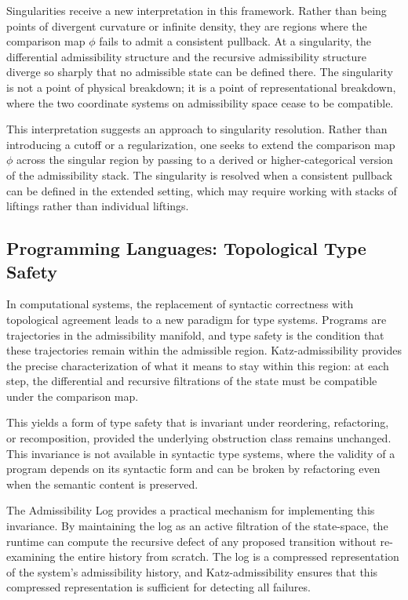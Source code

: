 \documentclass[12pt]{article}
\begin{document}
Singularities receive a new interpretation in this framework. Rather than being points
of divergent curvature or infinite density, they are regions where the comparison map
$\phi$ fails to admit a consistent pullback. At a singularity, the differential
admissibility structure and the recursive admissibility structure diverge so sharply
that no admissible state can be defined there. The singularity is not a point of
physical breakdown; it is a point of representational breakdown, where the two
coordinate systems on admissibility space cease to be compatible.

This interpretation suggests an approach to singularity resolution. Rather than
introducing a cutoff or a regularization, one seeks to extend the comparison map $\phi$
across the singular region by passing to a derived or higher-categorical version of the
admissibility stack. The singularity is resolved when a consistent pullback can be
defined in the extended setting, which may require working with stacks of liftings
rather than individual liftings.

\subsection{Programming Languages: Topological Type Safety}

In computational systems, the replacement of syntactic correctness with topological
agreement leads to a new paradigm for type systems. Programs are trajectories in the
admissibility manifold, and type safety is the condition that these trajectories remain
within the admissible region. Katz-admissibility provides the precise characterization
of what it means to stay within this region: at each step, the differential and
recursive filtrations of the state must be compatible under the comparison map.

This yields a form of type safety that is invariant under reordering, refactoring, or
recomposition, provided the underlying obstruction class remains unchanged. This
invariance is not available in syntactic type systems, where the validity of a program
depends on its syntactic form and can be broken by refactoring even when the semantic
content is preserved.

The Admissibility Log provides a practical mechanism for implementing this invariance.
By maintaining the log as an active filtration of the state-space, the runtime can
compute the recursive defect of any proposed transition without re-examining the entire
history from scratch. The log is a compressed representation of the system's
admissibility history, and Katz-admissibility ensures that this compressed
representation is sufficient for detecting all failures.
\end{document}
